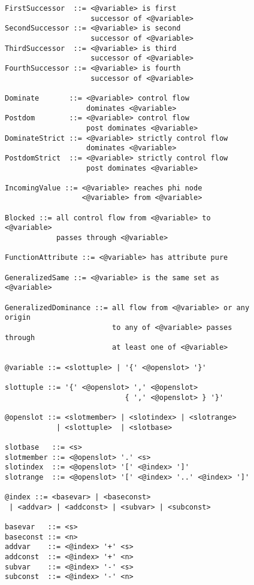 \begin{figure}[p]
\begin{lstlisting}[language=BNF,basicstyle=\linespread{0.8}\ttfamily,
                   firstnumber=89]
FirstSuccessor  ::= <@variable> is first
                    successor of <@variable>
SecondSuccessor ::= <@variable> is second
                    successor of <@variable>
ThirdSuccessor  ::= <@variable> is third
                    successor of <@variable>
FourthSuccessor ::= <@variable> is fourth
                    successor of <@variable>

Dominate       ::= <@variable> control flow
                   dominates <@variable>
Postdom        ::= <@variable> control flow
                   post dominates <@variable>
DominateStrict ::= <@variable> strictly control flow
                   dominates <@variable>
PostdomStrict  ::= <@variable> strictly control flow
                   post dominates <@variable>

IncomingValue ::= <@variable> reaches phi node
                  <@variable> from <@variable>

Blocked ::= all control flow from <@variable> to <@variable>
            passes through <@variable>

FunctionAttribute ::= <@variable> has attribute pure

GeneralizedSame ::= <@variable> is the same set as <@variable>

GeneralizedDominance ::= all flow from <@variable> or any origin
                         to any of <@variable> passes through
                         at least one of <@variable>

@variable ::= <slottuple> | '{' <@openslot> '}'

slottuple ::= '{' <@openslot> ',' <@openslot>
                            { ',' <@openslot> } '}'

@openslot ::= <slotmember> | <slotindex> | <slotrange>
            | <slottuple>  | <slotbase>

slotbase   ::= <s>
slotmember ::= <@openslot> '.' <s>
slotindex  ::= <@openslot> '[' <@index> ']'
slotrange  ::= <@openslot> '[' <@index> '..' <@index> ']'

@index ::= <basevar> | <baseconst>
 | <addvar> | <addconst> | <subvar> | <subconst>

basevar   ::= <s>
baseconst ::= <n>
addvar    ::= <@index> '+' <s>
addconst  ::= <@index> '+' <n>
subvar    ::= <@index> '-' <s>
subconst  ::= <@index> '-' <n>
\end{lstlisting}
\end{figure}